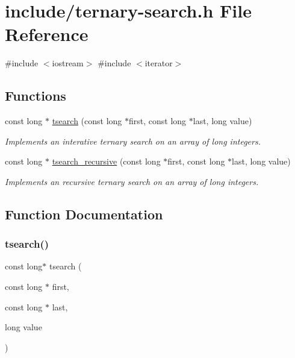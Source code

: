 \hypertarget{ternary-search_8h}{}\section{include/ternary-\/search.h File Reference}
\label{ternary-search_8h}
{\ttfamily \#include $<$iostream$>$}\newline
{\ttfamily \#include $<$iterator$>$}\newline
\subsection*{Functions}
\begin{DoxyCompactItemize}
\item 
const long $\ast$ \mbox{\hyperlink{ternary-search_8h_a5d1e6d2319a9d23db3a04557e0811c81}{tsearch}} (const long $\ast$first, const long $\ast$last, long value)
\begin{DoxyCompactList}\small\item\em Implements an interative ternary search on an array of long integers. \end{DoxyCompactList}\item 
const long $\ast$ \mbox{\hyperlink{ternary-search_8h_a3c64aebf53564a9b55057f719360e70c}{tsearch\+\_\+recursive}} (const long $\ast$first, const long $\ast$last, long value)
\begin{DoxyCompactList}\small\item\em Implements an recursive ternary search on an array of long integers. \end{DoxyCompactList}\end{DoxyCompactItemize}


\subsection{Function Documentation}
\mbox{\label{ternary-search_8h_a5d1e6d2319a9d23db3a04557e0811c81}} 
\subsubsection{\texorpdfstring{tsearch()}{tsearch()}}
{\footnotesize\ttfamily const long$\ast$ tsearch (\begin{DoxyParamCaption}\item[{const long $\ast$}]{first,  }\item[{const long $\ast$}]{last,  }\item[{long}]{value }\end{DoxyParamCaption})}




